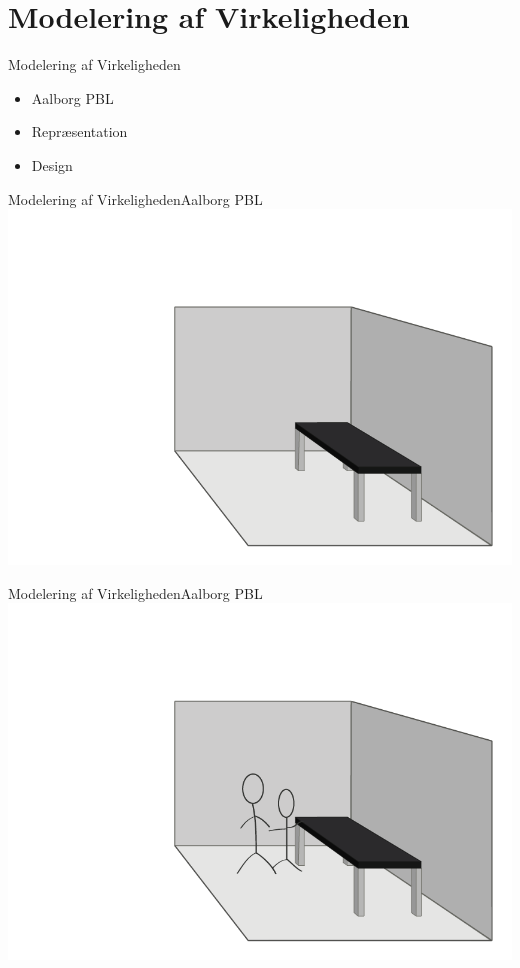 \newcommand{\modelreality}{Modelering af Virkeligheden}
\newcommand{\topicone}{Aalborg PBL}
\newcommand{\topictwo}{Repr\ae{}sentation}
\newcommand{\topicthree}{Eksempel}
\newcommand{\topicfour}{Design}
\section*{\modelreality}

\begin{frame}{\modelreality}
\begin{itemize}
	\item \topicone
  \item \topictwo
  \item \topicfour
\end{itemize}
\end{frame}
\begin{frame}{\modelreality}{\topicone} 
\includegraphics[width=\columnwidth]{input/rasmus/ras5.png}
\end{frame}
\begin{frame}{\modelreality}{\topicone} 
\includegraphics[width=\columnwidth]{input/rasmus/ras4.png}
\end{frame}
